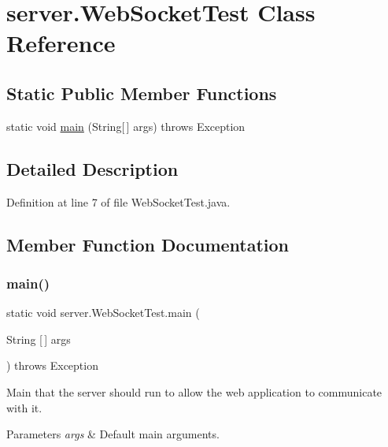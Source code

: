 \hypertarget{classserver_1_1_web_socket_test}{}\section{server.\+Web\+Socket\+Test Class Reference}
\label{classserver_1_1_web_socket_test}
\subsection*{Static Public Member Functions}
\begin{DoxyCompactItemize}
\item 
static void \hyperlink{classserver_1_1_web_socket_test_a3e9a6f18d139bb4f32373c7894a8aaf8}{main} (String\mbox{[}$\,$\mbox{]} args)  throws Exception 
\end{DoxyCompactItemize}


\subsection{Detailed Description}


Definition at line 7 of file Web\+Socket\+Test.\+java.



\subsection{Member Function Documentation}
\hypertarget{classserver_1_1_web_socket_test_a3e9a6f18d139bb4f32373c7894a8aaf8}{}\label{classserver_1_1_web_socket_test_a3e9a6f18d139bb4f32373c7894a8aaf8} 
\subsubsection{\texorpdfstring{main()}{main()}}
{\footnotesize\ttfamily static void server.\+Web\+Socket\+Test.\+main (\begin{DoxyParamCaption}\item[{String \mbox{[}$\,$\mbox{]}}]{args }\end{DoxyParamCaption}) throws Exception\hspace{0.3cm}{\ttfamily [static]}}

Main that the server should run to allow the web application to communicate with it. 
\begin{DoxyParams}{Parameters}
{\em args} & Default main arguments. \\
\hline
\end{DoxyParams}

